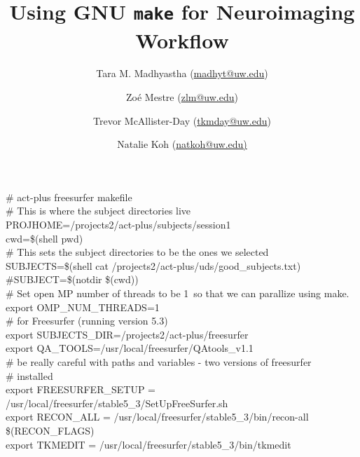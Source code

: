 \documentclass[oneside,11pt]{memoir}
\title{Using GNU \texttt{make} for Neuroimaging Workflow}
\author{ Tara M. Madhyastha (\url{madhyt@uw.edu}) \and Zo\'e Mestre (\url{zlm@uw.edu}) %
	\and Trevor McAllister-Day (\url{tkmday@uw.edu}) \and Natalie Koh (\url{natkoh@uw.edu)} %
}
\begin{document}
\small\ttfamily

\# act-plus freesurfer makefile \\
	
\# This is where the subject directories live \\
PROJHOME=/projects2/act-plus/subjects/session1 \\
	
cwd=\$(shell pwd) \\
	
\# This sets the subject directories to be the ones we selected \\
SUBJECTS=\$(shell cat /projects2/act-plus/uds/good_subjects.txt) \\
\#SUBJECT=\$(notdir \$(cwd)) \\
	
\# Set open MP number of threads to be 1\, so that we can parallize using make. \\
export OMP_NUM_THREADS=1 \\

\# for Freesurfer (running version 5.3) \\
export SUBJECTS_DIR=/projects2/act-plus/freesurfer \\
export QA_TOOLS=/usr/local/freesurfer/QAtools_v1.1 \\
	
\# be really careful with paths and variables - two versions of freesurfer \\
\# installed \\
export FREESURFER_SETUP = /usr/local/freesurfer/stable5_3/SetUpFreeSurfer.sh \\
export RECON_ALL = /usr/local/freesurfer/stable5_3/bin/recon-all \$(RECON_FLAGS) \\
export TKMEDIT = /usr/local/freesurfer/stable5_3/bin/tkmedit \\
	
\end{document}
